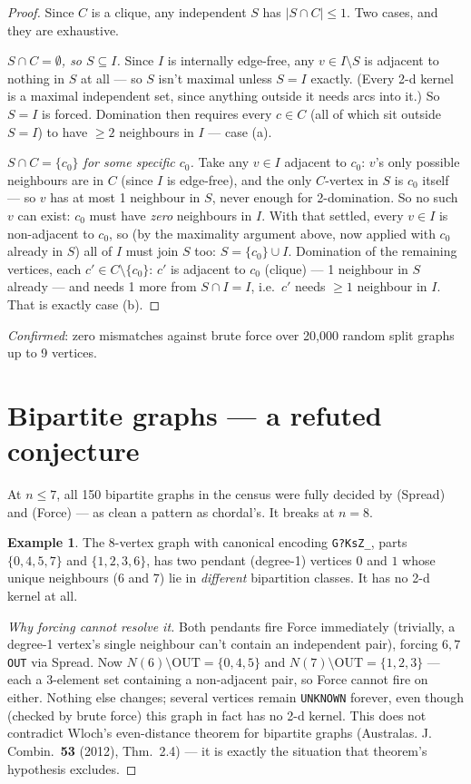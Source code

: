 \documentclass[11pt]{article}
\theoremstyle{plain}
\theoremstyle{definition}
\newtheorem{example}[theorem]{Example}
\theoremstyle{remark}
\begin{document}
\begin{proof}
Since $C$ is a clique, any independent $S$ has $|S\cap C|\le1$. Two cases, and they
are exhaustive.

\emph{$S\cap C=\emptyset$, so $S\subseteq I$.} Since $I$ is internally edge-free, any
$v\in I\setminus S$ is adjacent to nothing in $S$ at all — so $S$ isn't maximal
unless $S=I$ exactly. (Every 2-d kernel is a maximal independent set, since anything
outside it needs arcs into it.) So $S=I$ is forced. Domination then requires every
$c\in C$ (all of which sit outside $S=I$) to have $\ge2$ neighbours in $I$ — case (a).

\emph{$S\cap C=\{c_0\}$ for some specific $c_0$.} Take any $v\in I$ adjacent to
$c_0$: $v$'s only possible neighbours are in $C$ (since $I$ is edge-free), and the
only $C$-vertex in $S$ is $c_0$ itself — so $v$ has at most 1 neighbour in $S$,
never enough for 2-domination. So no such $v$ can exist: $c_0$ must have \emph{zero}
neighbours in $I$. With that settled, every $v\in I$ is non-adjacent to $c_0$, so (by
the maximality argument above, now applied with $c_0$ already in $S$) all of $I$
must join $S$ too: $S=\{c_0\}\cup I$. Domination of the remaining vertices, each
$c'\in C\setminus\{c_0\}$: $c'$ is adjacent to $c_0$ (clique) — 1 neighbour in $S$
already — and needs 1 more from $S\cap I=I$, i.e.\ $c'$ needs $\ge1$ neighbour in
$I$. That is exactly case (b).
\end{proof}

\emph{Confirmed}: zero mismatches against brute force over 20{,}000 random split
graphs up to 9 vertices.

\section{Bipartite graphs — a refuted conjecture}

At $n\le7$, all 150 bipartite graphs in the census were fully decided by (Spread) and
(Force) — as clean a pattern as chordal's. It breaks at $n=8$.

\begin{example}
The 8-vertex graph with canonical encoding \texttt{G?KsZ\_}, parts $\{0,4,5,7\}$ and
$\{1,2,3,6\}$, has two pendant (degree-1) vertices $0$ and $1$ whose unique
neighbours ($6$ and $7$) lie in \emph{different} bipartition classes. It has no
2-d kernel at all.
\end{example}

\begin{proof}[Why forcing cannot resolve it]
Both pendants fire Force immediately (trivially, a degree-1 vertex's single neighbour
can't contain an independent pair), forcing $6,7$ \texttt{OUT} via Spread. Now
$N(6)\setminus\text{OUT}=\{0,4,5\}$ and $N(7)\setminus\text{OUT}=\{1,2,3\}$ — each a
3-element set containing a non-adjacent pair, so Force cannot fire on either. Nothing
else changes; several vertices remain \texttt{UNKNOWN} forever, even though (checked
by brute force) this graph in fact has no 2-d kernel. This does not contradict Wloch's
even-distance theorem for bipartite graphs (Australas. J. Combin.\ \textbf{53}
(2012), Thm.\ 2.4) — it is exactly the situation that theorem's hypothesis excludes.
\end{proof}
\end{document}
